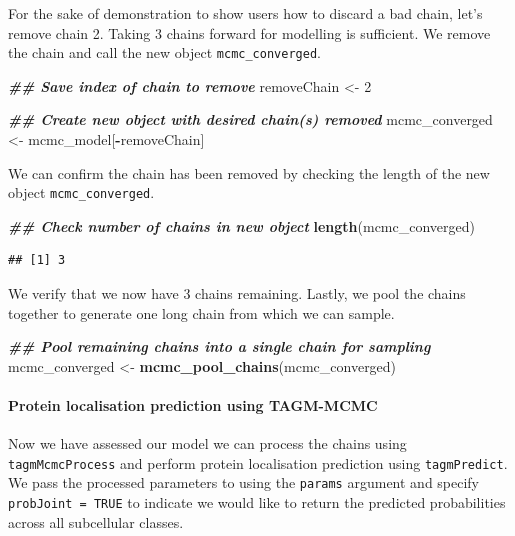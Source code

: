 \documentclass[9pt,a4paper,]{extarticle}
\newenvironment{Shaded}{\begin{snugshade}}{\end{snugshade}}
\newcommand{\DecValTok}[1]{\textcolor[rgb]{0.00,0.00,0.81}{#1}}
\newcommand{\DocumentationTok}[1]{\textcolor[rgb]{0.56,0.35,0.01}{\textbf{\textit{#1}}}}
\newcommand{\FunctionTok}[1]{\textcolor[rgb]{0.13,0.29,0.53}{\textbf{#1}}}
\newcommand{\NormalTok}[1]{#1}
\newcommand{\OtherTok}[1]{\textcolor[rgb]{0.56,0.35,0.01}{#1}}
\newcommand{\SpecialCharTok}[1]{\textcolor[rgb]{0.81,0.36,0.00}{\textbf{#1}}}
\begin{document}
For the sake of demonstration to show users how to discard a bad chain, let's
remove chain 2. Taking 3 chains forward for modelling is sufficient. We remove
the chain and call the new object \texttt{mcmc\_converged}.

\begin{Shaded}
\begin{Highlighting}[]
\DocumentationTok{\#\# Save index of chain to remove}
\NormalTok{removeChain }\OtherTok{\textless{}{-}} \DecValTok{2} 

\DocumentationTok{\#\# Create new object with desired chain(s) removed}
\NormalTok{mcmc\_converged }\OtherTok{\textless{}{-}}\NormalTok{ mcmc\_model[}\SpecialCharTok{{-}}\NormalTok{removeChain] }
\end{Highlighting}
\end{Shaded}

We can confirm the chain has been removed by checking the length of the new
object \texttt{mcmc\_converged}.

\begin{Shaded}
\begin{Highlighting}[]
\DocumentationTok{\#\# Check number of chains in new object}
\FunctionTok{length}\NormalTok{(mcmc\_converged)}
\end{Highlighting}
\end{Shaded}

\begin{verbatim}
## [1] 3
\end{verbatim}

We verify that we now have 3 chains remaining. Lastly, we pool the chains together
to generate one long chain from which we can sample.

\begin{Shaded}
\begin{Highlighting}[]
\DocumentationTok{\#\# Pool remaining chains into a single chain for sampling}
\NormalTok{mcmc\_converged }\OtherTok{\textless{}{-}} \FunctionTok{mcmc\_pool\_chains}\NormalTok{(mcmc\_converged)}
\end{Highlighting}
\end{Shaded}

\paragraph{Protein localisation prediction using TAGM-MCMC}\label{protein-localisation-prediction-using-tagm-mcmc}

Now we have assessed our model we can process the chains using \texttt{tagmMcmcProcess}
and perform protein localisation prediction using \texttt{tagmPredict}. We pass the
processed parameters to using the \texttt{params} argument and specify \texttt{probJoint\ =\ TRUE}
to indicate we would like to return the predicted probabilities across all
subcellular classes.
\end{document}
